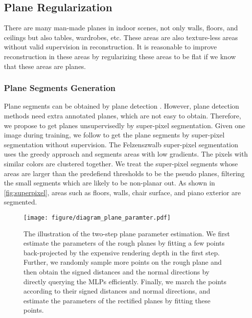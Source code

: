 \documentclass[10pt,journal,compsoc]{IEEEtran}
\begin{document}
	\subsection{Plane Regularization}
	There are many man-made planes in indoor scenes, not only walls, floors, and ceilings but also tables, wardrobes, etc. These areas are also texture-less areas without valid supervision in reconstruction. It is reasonable to improve reconstruction in these areas by regularizing these areas to be flat if we know that these areas are planes.
	
	\subsubsection{Plane Segments Generation}
	Plane segments can be obtained by plane detection \cite{liu2018planenet,liu2019planercnn,yu2019single}. However, plane detection methods need extra annotated planes, which are not easy to obtain. Therefore, we propose to get planes unsupervisedly by super-pixel segmentation. Given one image during training, we follow \cite{concha2014using,concha2015dpptam,yu2020p,li2021structdepth} to get the plane segments by super-pixel segmentation without supervision. The Felzenszwalb super-pixel segmentation\cite{felzenszwalb2004efficient} uses the greedy approach and segments areas with low gradients. The pixels with similar colors are clustered together. We treat the super-pixel segments whose areas are larger than the predefiend thresholds to be the pseudo planes, filtering the small segments which are likely to be non-planar out. As shown in \cref{fig:superpixel}, areas such as floors, walls, chair surface, and piano exterior are segmented.
	
	\begin{figure}[htbp]
		\centering
		\texttt{[image: figure/diagram\_plane\_paramter.pdf]}
		\caption{The illustration of the two-step plane parameter estimation. We first estimate the parameters of the rough planes by fitting a few points back-projected by the expensive rendering depth in the first step. Further, we randomly sample more points on the rough plane and then obtain the signed distances and the normal directions by directly querying the MLPs efficiently. Finally, we march the points according to their signed distances and normal directions, and estimate the parameters of the rectified planes by fitting these points.}
		\label{fig:plane_parameter}
	\end{figure}
	
\end{document}
